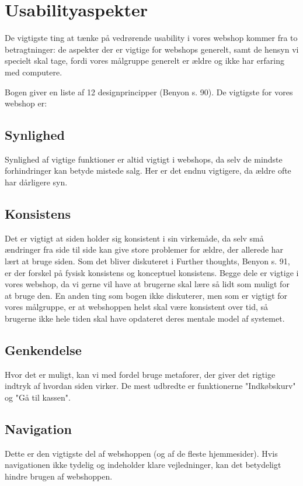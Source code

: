 \section{Usabilityaspekter}
De vigtigste ting at tænke på vedrørende usability i vores webshop kommer fra to
betragtninger: de aspekter der er vigtige for webshops generelt, samt de hensyn vi
specielt skal tage, fordi vores målgruppe generelt er ældre og ikke har erfaring med
computere.

Bogen giver en liste af 12 designprincipper (Benyon s. 90).
De vigtigste for vores webshop er: 

\subsection{Synlighed}
Synlighed af vigtige funktioner er altid vigtigt i webshops, da selv de mindste forhindringer
kan betyde mistede salg. Her er det endnu vigtigere, da ældre ofte har dårligere syn.

\subsection{Konsistens}
Det er vigtigt at siden holder sig konsistent i sin virkemåde, da selv små ændringer fra side til side
kan give store problemer for ældre, der allerede har lært at bruge siden. Som det bliver diskuteret i
Further thoughts, Benyon s. 91, er der forskel på fysisk konsistens og konceptuel konsistens. Begge dele
er vigtige i vores webshop, da vi gerne vil have at brugerne skal lære så lidt som muligt for at bruge den.
En anden ting som bogen ikke diskuterer, men som er vigtigt for vores målgruppe, er at webshoppen helst skal
være konsistent over tid, så brugerne ikke hele tiden skal have opdateret deres mentale model af systemet.

\subsection{Genkendelse}
Hvor det er muligt, kan vi med fordel bruge metaforer, der giver det rigtige indtryk af hvordan siden virker.
De mest udbredte er funktionerne "Indkøbskurv" og "Gå til kassen".

\subsection{Navigation}
Dette er den vigtigste del af webshoppen (og af de fleste hjemmesider). Hvis navigationen ikke tydelig og
indeholder klare vejledninger, kan det betydeligt hindre brugen af webshoppen.

